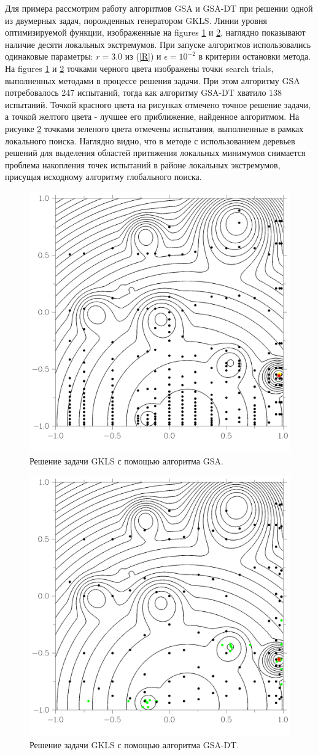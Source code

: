 \documentclass[entropy,article,submit,moreauthors,pdftex]{Definitions/mdpi}
\begin{document}
Для примера рассмотрим работу алгоритмов GSA и GSA-DT при решении одной из двумерных задач, порожденных генератором GKLS. 
Линии уровня оптимизируемой функции, изображенные на figures \ref{fig3} и \ref{fig4}, наглядно показывают наличие десяти локальных экстремумов.
При запуске алгоритмов использовались одинаковые параметры: $r=3.0$ из (\ref{R}) и $\epsilon = 10^{-2}$ в критерии остановки метода.
На figures \ref{fig3} и \ref{fig4} точками черного цвета изображены точки search trials, выполненных методами в процессе решения задачи. При этом алгоритму GSA потребовалось 247 испытаний, тогда как алгоритму GSA-DT хватило 138 испытаний. 
Точкой красного цвета на рисунках отмечено точное решение задачи, а точкой желтого цвета - лучшее его приближение, найденное алгоритмом. 
На рисунке \ref{fig4} точками зеленого цвета отмечены испытания, выполненные в рамках локального поиска. 
Наглядно видно, что в методе с использованием деревьев решений для выделения областей притяжения локальных минимумов снимается проблема накопления точек испытаний в районе локальных экстремумов, присущая исходному алгоритму глобального поиска.


\begin{figure}[H]
\includegraphics[width=0.6\linewidth]{GKLSAdaptiv6_30line.png}
\caption{Решение задачи GKLS с помощью алгоритма GSA.}
\label{fig3}
\end{figure}   

\begin{figure}[H]
\includegraphics[width=0.6\linewidth]{GKLSTree6_30line.png}
\caption{Решение задачи GKLS с помощью алгоритма GSA-DT.}
\label{fig4}
\end{figure}   
\end{document}
